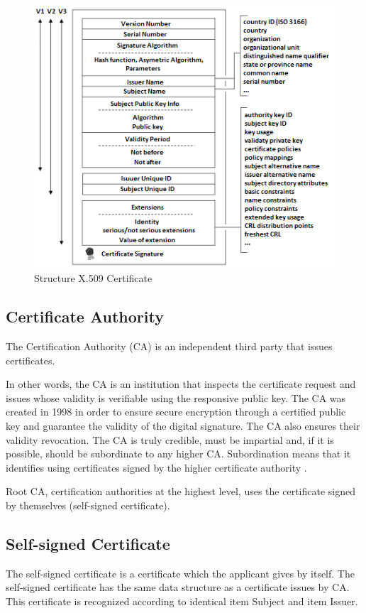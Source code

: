 \documentclass[
  digital, %
  notable,   %
  lof,     %
  lot,     %
]{fithesis3}
\begin{document}
\begin{figure}[th]
	\centering
	\includegraphics[width=1.05\textwidth]{certificate}
	\caption{Structure X.509 Certificate}
	\label{fig:certificate}
\end{figure}

\subsection{Certificate Authority}
The Certification Authority (CA) is an independent third party that issues certificates.

In other words, the CA is an institution that inspects the certificate request and issues whose 
validity is verifiable using the responsive public key. The CA was created in 1998 in order to 
ensure secure encryption through a certified public key and guarantee the validity of the digital 
signature. The CA also ensures their validity revocation. The CA is truly credible, must be 
impartial and, if it is possible, should be subordinate to any higher CA. Subordination means that 
it identifies using certificates signed by the higher certificate authority 
\cite{dostalek2016velky}.

Root CA, certification authorities at the highest level, uses the certificate signed by 
themselves (self-signed certificate).

\nocite{singh2003kniha}

\subsection{Self-signed Certificate}
The self-signed certificate is a certificate which the applicant gives by itself. The 
self-signed certificate has the same data structure as a certificate issues by CA. This 
certificate is recognized according to identical item Subject and item Issuer.
\end{document}

